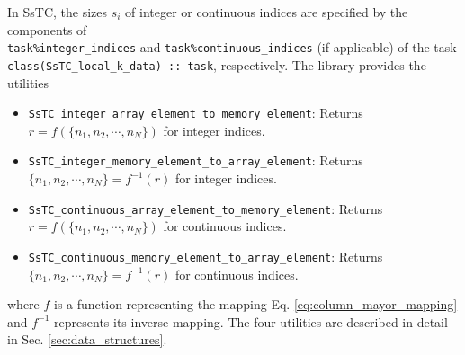 \documentclass[10pt,a4paper]{article}
\begin{document}
In SsTC, the sizes $s_i$ of integer or continuous indices are specified by the components of \\ \verb|task%integer_indices| and \verb|task%continuous_indices| (if applicable) of the task \\ \verb|class(SsTC_local_k_data) :: task|, respectively. The library provides the utilities
\begin{tcolorbox}
\begin{itemize}
\item \verb|SsTC_integer_array_element_to_memory_element|: Returns $r = f(\{n_1, n_2, \cdots, n_N\})$ for integer indices.
\item \verb|SsTC_integer_memory_element_to_array_element|: Returns $\{n_1, n_2, \cdots, n_N\} = f^{-1}(r)$ for integer indices.
\item \verb|SsTC_continuous_array_element_to_memory_element|: Returns $r = f(\{n_1, n_2, \cdots, n_N\})$ for continuous indices.
\item \verb|SsTC_continuous_memory_element_to_array_element|: Returns $\{n_1, n_2, \cdots, n_N\} = f^{-1}(r)$ for continuous indices.
\end{itemize}
\end{tcolorbox}
where $f$ is a function representing the mapping Eq. \eqref{eq:column_mayor_mapping} and $f^{-1}$ represents its inverse mapping. The four utilities are described in detail in Sec. \ref{sec:data_structures}.
\end{document}
